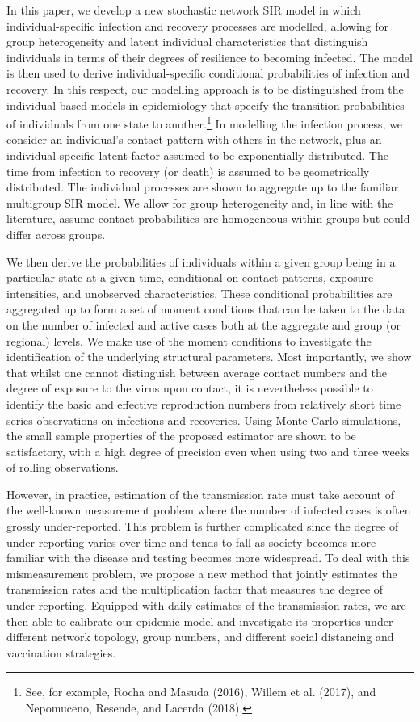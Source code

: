 \documentclass[12pt]{article}
\begin{document}
In this paper, we develop a new stochastic network SIR model in which
individual-specific infection and recovery processes are modelled, allowing
for group heterogeneity and latent individual characteristics that distinguish
individuals in terms of their degrees of resilience to becoming infected. The
model is then used to derive individual-specific conditional probabilities of
infection and recovery. In this respect, our modelling approach is to be
distinguished from the individual-based models in epidemiology that specify
the transition probabilities of individuals from one state to
another.\footnote{See, for example, Rocha and Masuda (2016), Willem et al.
(2017), and Nepomuceno, Resende, and Lacerda (2018).} In modelling the
infection process, we consider an individual's contact pattern with others in
the network, plus an individual-specific latent factor assumed to be
exponentially distributed. The time from infection to recovery (or death) is
assumed to be geometrically distributed. The individual processes are shown to
aggregate up to the familiar multigroup SIR model. We allow for group
heterogeneity and, in line with the literature, assume contact probabilities
are homogeneous within groups but could differ across groups.

We then derive the probabilities of individuals within a given group being in
a particular state at a given time, conditional on contact patterns, exposure
intensities, and unobserved characteristics. These conditional probabilities
are aggregated up to form a set of moment conditions that can be taken to the
data on the number of infected and active cases both at the aggregate and
group (or regional) levels. We make use of the moment conditions to
investigate the identification of the underlying structural parameters. Most
importantly, we show that whilst one cannot distinguish between average
contact numbers and the degree of exposure to the virus upon contact, it is
nevertheless possible to identify the basic and effective reproduction numbers
from relatively short time series observations on infections and recoveries.
Using Monte Carlo simulations, the small sample properties of the proposed
estimator are shown to be satisfactory, with a high degree of precision even
when using two and three weeks of rolling observations.

However, in practice, estimation of the transmission rate must take account of
the well-known measurement problem where the number of infected cases is often
grossly under-reported. This problem is further complicated since the degree
of under-reporting varies over time and tends to fall as society becomes more
familiar with the disease and testing becomes more widespread. To deal with
this mismeasurement problem, we propose a new method that jointly estimates
the transmission rates and the multiplication factor that measures the degree
of under-reporting. Equipped with daily estimates of the transmission rates,
we are then able to calibrate our epidemic model and investigate its
properties under different network topology, group numbers, and different
social distancing and vaccination strategies.
\end{document}
